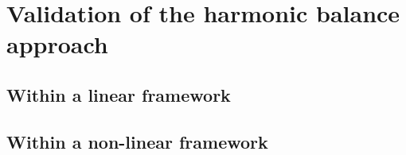 \chapter{Validation of the harmonic balance approach}
\label{cha:validation_hb}

\chabstract{}


\newpage


\section{Within a linear framework}
\label{sec:linear}


\section{Within a non-linear framework}
\label{sec:non_linear}

